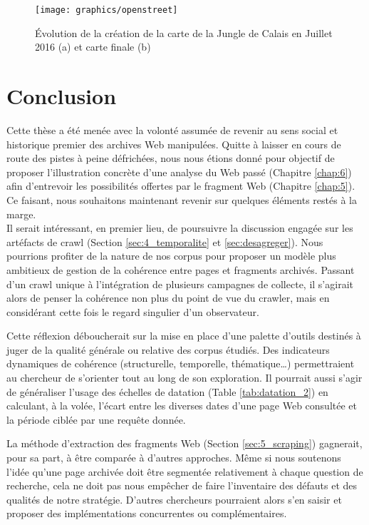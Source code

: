 \documentclass[symmetric,justified,marginals=raggedouter]{tufte-book}
\begin{document}
\begin{figure*}%
  \texttt{[image: graphics/openstreet]}
  \caption{Évolution de la création de la carte de la Jungle de Calais en Juillet 2016 (a) et carte finale (b)}
  \label{fig:openstreet}
\end{figure*}     



\chapter*{Conclusion}

\noindent Cette thèse a été menée avec la volonté assumée de revenir au sens social et historique premier des archives Web manipulées. Quitte à laisser en cours de route des pistes à peine défrichées, nous nous étions donné pour objectif de proposer l'illustration concrète d'une analyse du Web passé (Chapitre \ref{chap:6}) afin d'entrevoir les possibilités offertes par le fragment Web (Chapitre \ref{chap:5}). Ce faisant, nous souhaitons maintenant revenir  sur quelques éléments restés à la marge.\\ 

\noindent Il serait intéressant, en premier lieu, de poursuivre la discussion engagée sur les artéfacts de crawl (Section \ref{sec:4_temporalite} et \ref{sec:desagreger}). Nous pourrions profiter de la nature de nos corpus pour proposer un modèle plus ambitieux de gestion de la cohérence entre pages et fragments archivés. Passant d'un crawl unique à l'intégration de plusieurs campagnes de collecte, il s'agirait alors de penser la cohérence non plus du point de vue du crawler, mais en considérant cette fois le regard singulier d'un observateur.

Cette réflexion déboucherait sur la mise en place d'une palette d'outils destinés à juger de la qualité générale ou relative des corpus étudiés. Des indicateurs dynamiques de cohérence (structurelle, temporelle, thématique\ldots{}) permettraient au chercheur de s'orienter tout au long de son exploration. Il pourrait aussi s'agir de généraliser l'usage des échelles de datation (Table \ref{tab:datation_2}) en calculant, à la volée, l'écart entre les diverses dates d'une page Web consultée et la période ciblée par une requête donnée.

La méthode d'extraction des fragments Web (Section \ref{sec:5_scraping}) gagnerait, pour sa part, à être comparée à d'autres approches. Même si nous soutenons l'idée qu'une page archivée doit être segmentée relativement à chaque question de recherche, cela ne doit pas nous empêcher de faire l'inventaire des défauts et des qualités de notre stratégie. D'autres chercheurs pourraient alors s'en saisir et proposer des implémentations concurrentes ou complémentaires.  
\end{document}
